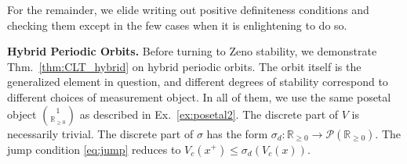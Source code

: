 \documentclass[letterpaper, 10 pt, conference]{IEEEconf}
\newcommand{\subsect}[1]{\vspace{0.5em}\noindent\textbf{#1.}}
\theoremstyle{definition}
\newcommand{\maps}{\colon}
\newcommand{\R}{\mathbb R}
\newcommand{\Rplus}{\R_{\geq 0}}
\newcommand{\functor}[1]{\mathcal{#1}}
\renewcommand{\P}{\functor{P}}
\begin{document}
For the remainder, we elide writing out positive definiteness conditions and checking them except in the few cases when it is enlightening to do so.

\subsect{Hybrid Periodic Orbits}
%
Before turning to Zeno stability, we demonstrate Thm.~\ref{thm:CLT_hybrid} on hybrid periodic orbits. The orbit itself is the generalized element in question, and different degrees of stability correspond to different choices of measurement object. In all of them, we use the same posetal object $\binom 1{\Rplus}$ as described in Ex.~\ref{ex:posetal2}. 
The discrete part of $V$ is necessarily trivial. The discrete part of $\sigma$ has the form $\sigma_d \maps \Rplus \to \P(\Rplus)$. The jump condition \eqref{eq:jump} reduces to $V_c(x^+) \leq \sigma_d(V_c(x))$.
\end{document}
